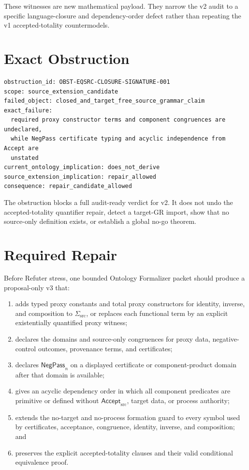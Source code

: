 \documentclass[11pt]{article}
\newcommand{\Accept}{\mathsf{Accept}_{\mathrm{src}}}
\begin{document}
These witnesses are new mathematical payload. They narrow the v2 audit to a
specific language-closure and dependency-order defect rather than repeating
the v1 accepted-totality countermodels.

\section{Exact Obstruction}

\begin{verbatim}
obstruction_id: OBST-EQSRC-CLOSURE-SIGNATURE-001
scope: source_extension_candidate
failed_object: closed_and_target_free_source_grammar_claim
exact_failure:
  required proxy constructor terms and component congruences are undeclared,
  while NegPass certificate typing and acyclic independence from Accept are
  unstated
current_ontology_implication: does_not_derive
source_extension_implication: repair_allowed
consequence: repair_candidate_allowed
\end{verbatim}

The obstruction blocks a full audit-ready verdict for v2. It does not undo the
accepted-totality quantifier repair, detect a target-GR import, show that no
source-only definition exists, or establish a global no-go theorem.

\section{Required Repair}

Before Refuter stress, one bounded Ontology Formalizer packet should produce a
proposal-only v3 that:
\begin{enumerate}[leftmargin=*]
  \item adds typed proxy constants and total proxy constructors for identity,
  inverse, and composition to \(\Sigma_{\mathrm{src}}\), or replaces each
  functional term by an explicit existentially quantified proxy witness;
  \item declares the domains and source-only congruences for proxy data,
  negative-control outcomes, provenance terms, and certificates;
  \item declares \(\mathsf{NegPass}_{n}\) on a displayed certificate or
  component-product domain after that domain is available;
  \item gives an acyclic dependency order in which all component predicates
  are primitive or defined without \(\Accept\), target data, or process
  authority;
  \item extends the no-target and no-process formation guard to every symbol
  used by certificates, acceptance, congruence, identity, inverse, and
  composition; and
  \item preserves the explicit accepted-totality clauses and their valid
  conditional equivalence proof.
\end{enumerate}
\end{document}
